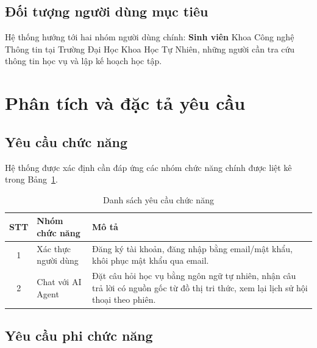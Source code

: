 \subsection{Đối tượng người dùng mục tiêu}

Hệ thống hướng tới hai nhóm người dùng chính: \textbf{Sinh viên} Khoa Công nghệ Thông tin tại Trường Đại Học Khoa Học Tự Nhiên, những người cần tra cứu thông tin học vụ và lập kế hoạch học tập.

\section{Phân tích và đặc tả yêu cầu}

\subsection{Yêu cầu chức năng}

Hệ thống được xác định cần đáp ứng các nhóm chức năng chính được liệt kê trong Bảng~\ref{tab:yc_chuc_nang}.

\begin{table}[H]
	\centering
	\renewcommand{\arraystretch}{1.4}
	\caption{Danh sách yêu cầu chức năng}
	\label{tab:yc_chuc_nang}
	\begin{tabular}{|c|>{\raggedright\arraybackslash}p{4cm}|>{\raggedright\arraybackslash}p{8.5cm}|}
		\hline
		\textbf{STT} & \textbf{Nhóm chức năng} & \textbf{Mô tả} \\ \hline
		1 & Xác thực người dùng & Đăng ký tài khoản, đăng nhập bằng email/mật khẩu, khôi phục mật khẩu qua email. \\ \hline
		2 & Chat với AI Agent & Đặt câu hỏi học vụ bằng ngôn ngữ tự nhiên, nhận câu trả lời có nguồn gốc từ đồ thị tri thức, xem lại lịch sử hội thoại theo phiên. \\ \hline
	\end{tabular}
\end{table}

\subsection{Yêu cầu phi chức năng}

